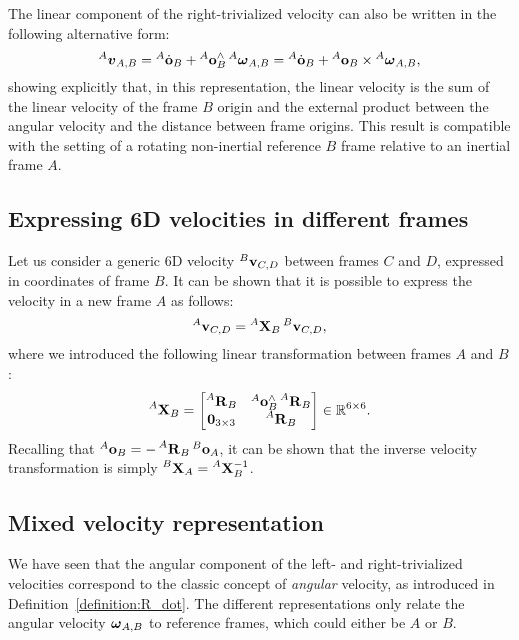 The linear component of the right-trivialized velocity can also be written in the following alternative form:
%
\begin{equation}
    \label{eq:vel_lin_inertial_fixed}
    \vellin[A]_{A,B} =
    \orid[A]_B + \ori[A]_B^\wedge \velang[A]_{A,B} =
    \orid[A]_B + \ori[A]_B \times \velang[A]_{A,B}
    ,
\end{equation}
%
showing explicitly that, in this representation, the linear velocity is the sum of the linear velocity of the frame $B$ origin and the external product between the angular velocity and the distance between frame origins.
This result is compatible with the setting of a rotating non-inertial reference $B$ frame relative to an inertial frame $A$.

\subsection{Expressing 6D velocities in different frames}

Let us consider a generic 6D velocity $\velsix[B]_{C, D}$ between frames $C$ and $D$, expressed in coordinates of frame $B$.
It can be shown that it is possible to express the velocity in a new frame $A$ as follows:
%
\begin{equation*}
    \velsix[A]_{C, D} = \veladj[A]_B \velsix[B]_{C, D}
    ,
\end{equation*}
%
where we introduced the following linear transformation between frames $A$ and $B$:
%
\begin{equation}
    \label{equation:velocity_adjoint}
    \veladj[A]_B =
    \begin{bmatrix}
        \rot[A]_B & \ori[A]_B^\wedge \rot[A]_B \\
        \zeros_{3\times3} & \rot[A]_B
    \end{bmatrix}
    \in \realn^{6\times6}
    .
\end{equation}
%
%
Recalling that $\ori[A]_B = -\rot[A]_B \ori[B]_A$, it can be shown that the inverse velocity transformation is simply $\veladj[B]_A = \veladj[A]_B^{-1}$.

\subsection{Mixed velocity representation}

We have seen that the angular component of the left- and right-trivialized velocities correspond to the classic concept of \emph{angular} velocity, as introduced in Definition~\ref{definition:R_dot}.
The different representations only relate the angular velocity $\velang_{A,B}$ to reference frames, which could either be $A$ or $B$.

